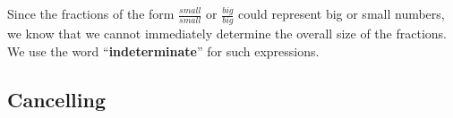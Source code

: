 \documentclass{ximera}
\begin{document}
Since the fractions of the form $\frac{small}{small}$  or  $\frac{big}{big}$ could represent big or small numbers, we know that we cannot immediately determine the overall size of the fractions.  We use the word ``\textbf{\textcolor{blue!55!black}{indeterminate}}'' for such expressions.












\newpage







\subsection*{Cancelling}
\end{document}
